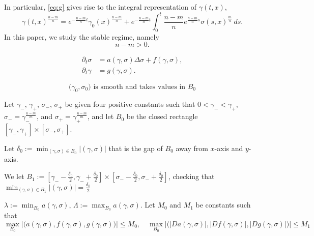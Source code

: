 \documentclass[a4paper,11pt]{article}
\theoremstyle{remark}
\begin{document}
In particular, \eqref{eq:g} gives rise to the integral representation of $\gamma(t,x)$,
\begin{equation}
 \gamma(t,x)^{\frac{n-m}{n}} = e^{-\frac{n-m}{n}t}\gamma_0(x)^{\frac{n-m}{n}} + e^{-\frac{n-m}{n}t}\int_0^t \frac{n-m}{n} e^{\frac{n-m}{n}s} \sigma(s,x)^{\frac{m}{n}} \: ds. \label{rep}
\end{equation}
In this paper, we study the stable regime, namely
\begin{equation}
 n-m>0. \label{stable}
\end{equation}

\newpage

 \begin{equation} \label{system}
\begin{aligned}
 \partial_t \sigma &= a(\gamma,\sigma) \Delta \sigma + f(\gamma,\sigma) ,\\
 \partial_t \gamma &= g(\gamma,\sigma). 
\end{aligned}
\end{equation}



\begin{equation} \label{assumption}
 \text{$\big(\gamma_0,\sigma_0\big)$ is smooth and takes values in $B_0$}
\end{equation}



Let $\gamma_-$, $\gamma_+$, $\sigma_-$, $\sigma_+$ be given four positive constants such that $0<\gamma_-< \gamma_+$, $\sigma_-=\gamma_-^{\frac{n-m}{m}}$, and $\sigma_+ = \gamma_+^{\frac{n-m}{m}}$, and let $B_0$ be the closed rectangle $[\gamma_-, \gamma_+] \times [\sigma_-, \sigma_+]$.

Let $\displaystyle\delta_0:= \min_{(\gamma,\sigma)\in B_0}|(\gamma,\sigma)|$ that is the gap of $B_0$ away from $x$-axis and $y$-axis.

We let $B_1:=[\gamma_- - \frac{\delta_0}{2}, \gamma_- + \frac{\delta_0}{2}] \times  [\sigma_- - \frac{\delta_0}{2}, \sigma_- + \frac{\delta_0}{2}]$, checking that $\displaystyle\min_{(\gamma,\sigma)\in B_1}|(\gamma,\sigma)| = \frac{\delta_0}{2}$

$\displaystyle\lambda:= \min_{B_0} a(\gamma,\sigma)$, $\displaystyle \Lambda:=\max_{B_0} a(\gamma,\sigma)$. Let $M_0$ and $M_1$ be constants such that 
$$\displaystyle \max_{B_0} \Big|\big(a(\gamma,\sigma),f(\gamma,\sigma), g(\gamma,\sigma)\big)\Big| \le M_0, \quad \max_{B_0} \Big|\big(|Da(\gamma,\sigma)|,|Df(\gamma,\sigma)|, |Dg(\gamma,\sigma)|\big)\Big| \le M_1$$
\end{document}
